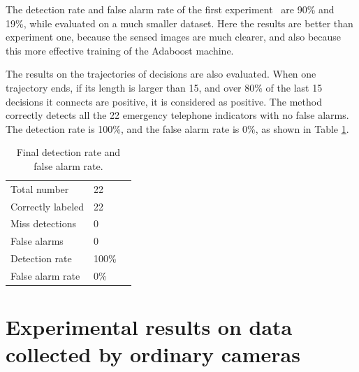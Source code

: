The detection rate and false alarm rate of the first experiment~\citep{wang1} are 90\% and 19\%, while evaluated on a much smaller dataset. Here the results are better than   experiment one, because the sensed images are much clearer, and also because this more effective training of the Adaboost machine. 

The results on the trajectories of decisions are also evaluated. When one trajectory ends, if its length is larger than 15, and over 80\% of the last 15 decisions it connects are positive, it is considered as positive. The method correctly detects all the 22 emergency telephone indicators with no false alarms. The detection rate is 100\%, and the false alarm rate is 0\%, as shown in Table \ref{tb:tb3}.

\begin{table}[h]
\centering
\begin{tabular}{lll}
     \hline
     \hline
   Total number & 22  \\
    Correctly labeled &	22   \\
    Miss detections &	0 &	  \\
    False alarms &	0    \\
    Detection rate &	100\% &	  \\
    False alarm rate &	0\% &	   \\
   \hline
\end{tabular}
\caption[Final detection rate and false alarm rate]{Final detection rate and false alarm rate.}\label{tb:tb3}
\end{table}

\section{Experimental results on data collected by ordinary cameras}
\label{ord}




